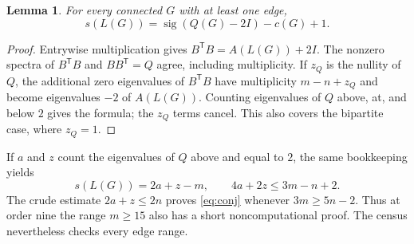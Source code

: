 \documentclass[11pt]{amsart}
\newtheorem{lemma}[theorem]{Lemma}
\begin{document}
\begin{lemma}\label{lem:transfer}
For every connected $G$ with at least one edge,
\[s(L(G))=\operatorname{sig}(Q(G)-2I)-c(G)+1.\]
\end{lemma}
\begin{proof}
Entrywise multiplication gives
$B^{\mathsf T}B=A(L(G))+2I$. The nonzero spectra of
$B^{\mathsf T}B$ and $BB^{\mathsf T}=Q$ agree, including multiplicity.
If $z_Q$ is the nullity of $Q$, the additional zero eigenvalues of
$B^{\mathsf T}B$ have multiplicity $m-n+z_Q$ and become eigenvalues $-2$ of
$A(L(G))$. Counting eigenvalues of $Q$ above, at, and below $2$ gives the
formula; the $z_Q$ terms cancel. This also covers the bipartite case, where
$z_Q=1$.
\end{proof}

If $a$ and $z$ count the eigenvalues of $Q$ above and equal to $2$, the same
bookkeeping yields
\begin{equation}\label{eq:threshold}
s(L(G))=2a+z-m,\qquad 4a+2z\leq3m-n+2.
\end{equation}
The crude estimate $2a+z\leq2n$ proves \eqref{eq:conj} whenever
$3m\geq5n-2$. Thus at order nine the range $m\geq15$ also has a short
noncomputational proof. The census nevertheless checks every edge range.
\end{document}
